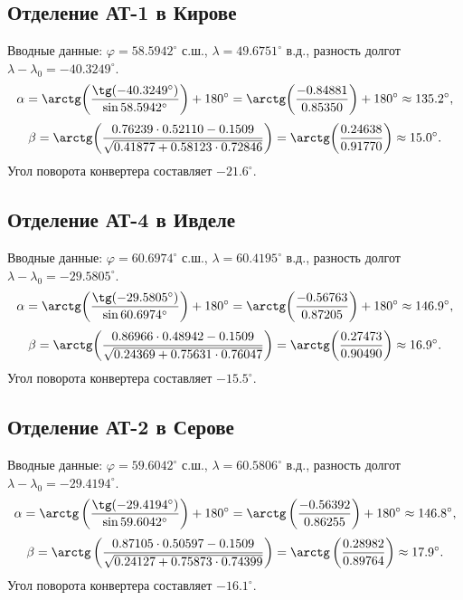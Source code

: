 \subsection{Отделение АТ-1 в Кирове}

Вводные данные: $\varphi = 58.5942^\circ$ с.ш., $\lambda = 49.6751^\circ$ в.д., разность долгот $\lambda - \lambda_0 = -40.3249^\circ$.
\begin{equation*}
    \alpha = \arctg\!\left(\frac{\tg(-40.3249^\circ)}{\sin 58.5942^\circ}\right) + 180^\circ = \arctg\!\left(\frac{-0.84881}{0.85350}\right) + 180^\circ \approx 135.2^\circ,
\end{equation*}
\begin{equation*}
    \beta = \arctg\!\left(\frac{0.76239 \cdot 0.52110 - 0.1509}{\sqrt{0.41877 + 0.58123 \cdot 0.72846}}\right) = \arctg\!\left(\frac{0.24638}{0.91770}\right) \approx 15.0^\circ.
\end{equation*}
Угол поворота конвертера составляет $-21.6^\circ$.

\subsection{Отделение АТ-4 в Ивделе}

Вводные данные: $\varphi = 60.6974^\circ$ с.ш., $\lambda = 60.4195^\circ$ в.д., разность долгот $\lambda - \lambda_0 = -29.5805^\circ$.
\begin{equation*}
    \alpha = \arctg\!\left(\frac{\tg(-29.5805^\circ)}{\sin 60.6974^\circ}\right) + 180^\circ = \arctg\!\left(\frac{-0.56763}{0.87205}\right) + 180^\circ \approx 146.9^\circ,
\end{equation*}
\begin{equation*}
    \beta = \arctg\!\left(\frac{0.86966 \cdot 0.48942 - 0.1509}{\sqrt{0.24369 + 0.75631 \cdot 0.76047}}\right) = \arctg\!\left(\frac{0.27473}{0.90490}\right) \approx 16.9^\circ.
\end{equation*}
Угол поворота конвертера составляет $-15.5^\circ$.

\subsection{Отделение АТ-2 в Серове}

Вводные данные: $\varphi = 59.6042^\circ\text{ с.ш.}$, $\lambda = 60.5806^\circ\text{ в.д.}$, разность долгот $\lambda - \lambda_0 = -29.4194^\circ$.
\begin{equation*}
    \alpha = \arctg\left(\frac{\tg(-29.4194^\circ)}{\sin 59.6042^\circ}\right) + 180^\circ = \arctg\left(\frac{-0.56392}{0.86255}\right) + 180^\circ \approx 146.8^\circ,
\end{equation*}
\begin{equation*}
    \beta = \arctg\left(\frac{0.87105 \cdot 0.50597 - 0.1509}{\sqrt{0.24127 + 0.75873 \cdot 0.74399}}\right) = \arctg\left(\frac{0.28982}{0.89764}\right) \approx 17.9^\circ.
\end{equation*}
Угол поворота конвертера составляет $-16.1^\circ$.

